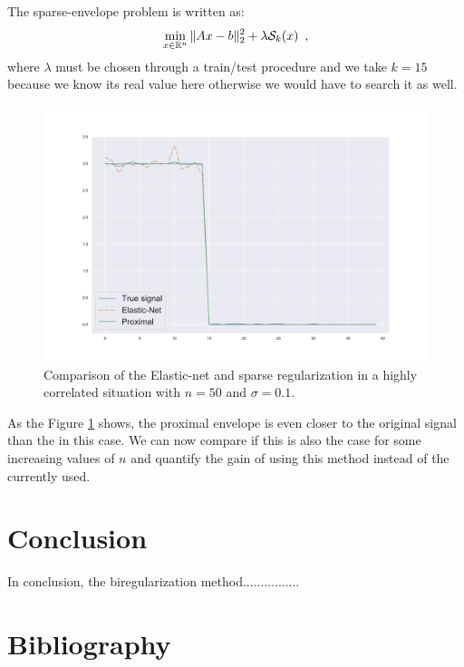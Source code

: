 \documentclass{article}
\begin{document}

The sparse-envelope problem is written as:
\[\min_{x\in \mathbb{R}^n} \|Ax-b\|^2_2 + \lambda\mathcal{S}_k(x)\enspace,\]
where $\lambda$ must be chosen through a train/test procedure and we take $k=15$ because we know its real value here otherwise we would have to search it as well.

\begin{center}
    \begin{figure}
        \centering
        \includegraphics[width=.9\linewidth]{enet_proxi.pdf}
        \caption{Comparison of the Elastic-net and sparse regularization in a highly correlated situation with $n=50$ and $\sigma=0.1$.}
        \label{fig:enet_sp}
    \end{figure}
\end{center}

As the Figure \ref{fig:enet_sp} shows, the proximal envelope is even closer to the original signal than the \enet in this case.
We can now compare if this is also the case for some increasing values of $n$ and quantify the gain of using this method instead of the \enet currently used.


\section*{Conclusion}

In conclusion, the biregularization method................



\section{Bibliography}
\nocite{*}
\printbibliography
\end{document}
